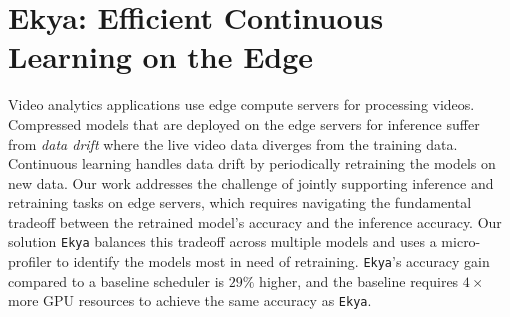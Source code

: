 \newcommand{\eg}{{\it e.g.,}\xspace}
\newcommand{\ie}{{\it i.e.,}\xspace}
\newcommand{\tbd}[1]{{\bf [[TBD: {#1}]]}}
\newcommand{\eat}[1]{}
\newcommand{\xref}[1]{\S\ref{#1}}
\newcommand{\name}{{\tt Ekya}\xspace}
\newcommand{\fair}{uniform\xspace}
\newcommand{\Fair}{Uniform\xspace}
\newcommand{\myparashort}[1]{\vspace{0.07cm}\noindent{\bf {#1}}~}
\newcommand{\mypara}[1]{\vspace{0.07cm}\noindent{\bf {#1}:}~}
\newcommand{\myparaq}[1]{\vspace{0.07cm}\noindent{\bf {#1}?}~}

\chapter{Ekya: Efficient Continuous Learning on the Edge}
\label{ch_ekya}

Video analytics applications use edge compute servers for processing videos.  
Compressed models that are deployed on the edge servers for inference suffer from {\em data drift} where the live video data diverges from the training data. Continuous learning handles data drift by periodically retraining the models on new data. Our work addresses the challenge of jointly supporting inference and retraining tasks on edge servers, which requires navigating the fundamental tradeoff between the retrained model's accuracy and the inference accuracy. 
Our solution \name balances this tradeoff across multiple models and uses a micro-profiler to identify the models most in need of retraining. {\name}'s accuracy gain compared to a baseline scheduler is $29\%$ higher, and the baseline requires $4\times$ more GPU resources to achieve the same accuracy as \name.











%
%
%



%
% 
